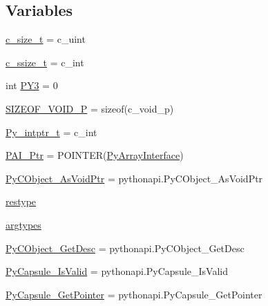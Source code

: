 \subsection*{Variables}
\begin{DoxyCompactItemize}
\item 
\hyperlink{namespacepygame_1_1tests_1_1test__utils_1_1arrinter_ac6afdf59c1536a3d6a404f1cc6486c0b}{c\+\_\+size\+\_\+t} = c\+\_\+uint
\item 
\hyperlink{namespacepygame_1_1tests_1_1test__utils_1_1arrinter_a18acade30052a500d001fe6a417989e0}{c\+\_\+ssize\+\_\+t} = c\+\_\+int
\item 
int \hyperlink{namespacepygame_1_1tests_1_1test__utils_1_1arrinter_afb3a3b6b443359228558ac6b9682e703}{P\+Y3} = 0
\item 
\hyperlink{namespacepygame_1_1tests_1_1test__utils_1_1arrinter_a9ca1da352e39f97531b15f35aa590c98}{S\+I\+Z\+E\+O\+F\+\_\+\+V\+O\+I\+D\+\_\+P} = sizeof(c\+\_\+void\+\_\+p)
\item 
\hyperlink{namespacepygame_1_1tests_1_1test__utils_1_1arrinter_a7e45f4924bcbf450884074ff4f3173c8}{Py\+\_\+intptr\+\_\+t} = c\+\_\+int
\item 
\hyperlink{namespacepygame_1_1tests_1_1test__utils_1_1arrinter_a9801eaaea430f453c57ce2d9817afc60}{P\+A\+I\+\_\+\+Ptr} = P\+O\+I\+N\+T\+ER(\hyperlink{classpygame_1_1tests_1_1test__utils_1_1arrinter_1_1_py_array_interface}{Py\+Array\+Interface})
\item 
\hyperlink{namespacepygame_1_1tests_1_1test__utils_1_1arrinter_a1a64f426026cabc0201e6fd3e6083168}{Py\+C\+Object\+\_\+\+As\+Void\+Ptr} = pythonapi.\+Py\+C\+Object\+\_\+\+As\+Void\+Ptr
\item 
\hyperlink{namespacepygame_1_1tests_1_1test__utils_1_1arrinter_a8bf43eb04cb59f083753fd3e15df18de}{restype}
\item 
\hyperlink{namespacepygame_1_1tests_1_1test__utils_1_1arrinter_aacef7a2c4cef309f79efebe8a3ea460c}{argtypes}
\item 
\hyperlink{namespacepygame_1_1tests_1_1test__utils_1_1arrinter_abe8c21d68fdcbe3fa29a6427341c1ba8}{Py\+C\+Object\+\_\+\+Get\+Desc} = pythonapi.\+Py\+C\+Object\+\_\+\+Get\+Desc
\item 
\hyperlink{namespacepygame_1_1tests_1_1test__utils_1_1arrinter_af9da3c964d3cde7e8192fe58ba8941b9}{Py\+Capsule\+\_\+\+Is\+Valid} = pythonapi.\+Py\+Capsule\+\_\+\+Is\+Valid
\item 
\hyperlink{namespacepygame_1_1tests_1_1test__utils_1_1arrinter_aebdf47acb8b8e96a3e7dd39e43f0f084}{Py\+Capsule\+\_\+\+Get\+Pointer} = pythonapi.\+Py\+Capsule\+\_\+\+Get\+Pointer

\end{DoxyCompactItemize}
